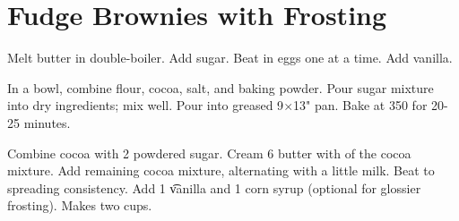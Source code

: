 \section{Fudge Brownies with Frosting}
\begin{recipe}



	Melt butter in double-boiler. Add sugar. Beat in eggs one at a time. Add vanilla.

	In a bowl, combine flour, cocoa, salt, and baking powder. Pour sugar mixture into dry ingredients; mix well. Pour into greased 9$\times$13" pan. Bake at 350 for 20-25 minutes.

	 Combine  \cup cocoa with 2  \cup powdered sugar. Cream 6 \T butter with  \cup of the cocoa mixture. Add remaining cocoa mixture, alternating with a little milk. Beat to spreading consistency. Add 1 \t vanilla and 1 \T corn syrup (optional for glossier frosting). Makes two cups.

\end{recipe}
